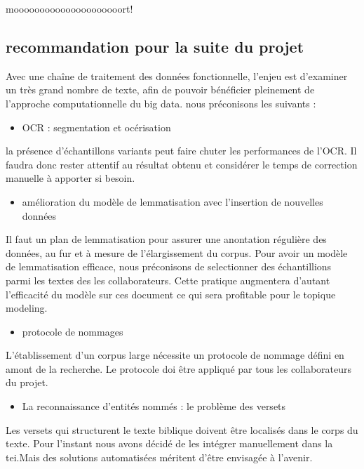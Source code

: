  mooooooooooooooooooooort!


\subsection{recommandation pour la suite du projet}
Avec une chaîne de traitement des données fonctionnelle, l'enjeu est d'examiner un très grand nombre de texte, afin de pouvoir bénéficier pleinement de l'approche computationnelle du big data. nous préconisons les suivants :
\begin{itemize}
    \item OCR : segmentation et océrisation
\end{itemize}
    la présence d'échantillons variants peut faire chuter les performances de l'OCR. Il faudra donc rester attentif au résultat obtenu et considérer le temps de correction manuelle à apporter si besoin. 
\begin{itemize}
    \item amélioration du modèle de lemmatisation avec l'insertion de nouvelles données
\end{itemize}
Il faut un plan de lemmatisation pour assurer une anontation régulière des données, au fur et à mesure de l'élargissement du corpus. Pour avoir un modèle de lemmatisation efficace, nous préconisons de selectionner des échantillions parmi les textes des les collaborateurs. Cette pratique augmentera d'autant l'efficacité du modèle sur ces document ce qui sera profitable pour le topique modeling.   
\begin{itemize}
    \item protocole de nommages
\end{itemize}
 L'établissement d'un corpus large nécessite un protocole de nommage défini en amont de la recherche. Le protocole doi être appliqué par tous les collaborateurs du projet.
 \begin{itemize}
    \item La reconnaissance d'entités nommés : le problème des versets
\end{itemize}
Les versets qui structurent le texte biblique doivent être localisés dans le corps du texte. Pour l'instant nous avons décidé de les intégrer manuellement dans la tei.Mais des solutions automatisées méritent d'être envisagée à l'avenir.